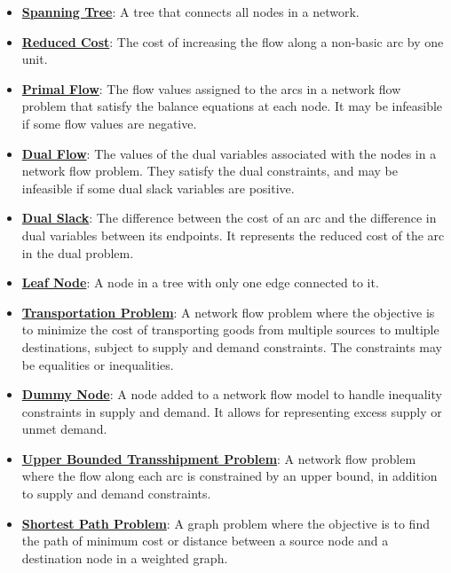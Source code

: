 \documentclass{article}%
\begin{document}
\begin{itemize}[leftmargin=*]
\item \href{https://www.math.purdue.edu/~yipn/421//2024-11-05-NetFlows.pdf#page=10}{\textbf{Spanning Tree}}: A tree that connects all nodes in a network.%
\item \href{https://www.math.purdue.edu/~yipn/421//2024-11-05-NetFlows.pdf#page=22}{\textbf{Reduced Cost}}: The cost of increasing the flow along a non-basic arc by one unit.%
\item \href{https://www.math.purdue.edu/~yipn/421//2024-11-07-NetSimplex.pdf#page=2}{\textbf{Primal Flow}}: The flow values assigned to the arcs in a network flow problem that satisfy the balance equations at each node.  It may be infeasible if some flow values are negative.%
\item \href{https://www.math.purdue.edu/~yipn/421//2024-11-07-NetSimplex.pdf#page=3}{\textbf{Dual Flow}}: The values of the dual variables associated with the nodes in a network flow problem.  They satisfy the dual constraints, and may be infeasible if some dual slack variables are positive.%
\item \href{https://www.math.purdue.edu/~yipn/421//2024-11-07-NetSimplex.pdf#page=3}{\textbf{Dual Slack}}: The difference between the cost of an arc and the difference in dual variables between its endpoints.  It represents the reduced cost of the arc in the dual problem.%
\item \href{https://www.math.purdue.edu/~yipn/421//2024-11-07-NetSimplex.pdf#page=2}{\textbf{Leaf Node}}: A node in a tree with only one edge connected to it.%
\item \href{https://www.math.purdue.edu/~yipn/421//2024-11-14-NetAppls.pdf#page=1}{\textbf{Transportation Problem}}: A network flow problem where the objective is to minimize the cost of transporting goods from multiple sources to multiple destinations, subject to supply and demand constraints. The constraints may be equalities or inequalities.%
\item \href{https://www.math.purdue.edu/~yipn/421//2024-11-14-NetAppls.pdf#page=3}{\textbf{Dummy Node}}: A node added to a network flow model to handle inequality constraints in supply and demand.  It allows for representing excess supply or unmet demand.%
\item \href{https://www.math.purdue.edu/~yipn/421//2024-11-14-NetAppls.pdf#page=9}{\textbf{Upper Bounded Transshipment Problem}}: A network flow problem where the flow along each arc is constrained by an upper bound, in addition to supply and demand constraints.%
\item \href{https://www.math.purdue.edu/~yipn/421//2024-11-14-NetAppls.pdf#page=13}{\textbf{Shortest Path Problem}}: A graph problem where the objective is to find the path of minimum cost or distance between a source node and a destination node in a weighted graph.%

\end{itemize}
\end{document}
